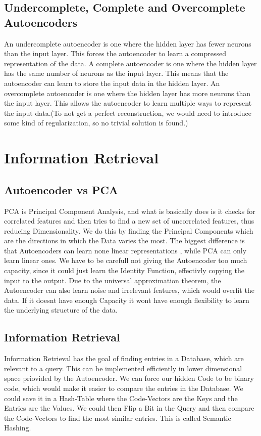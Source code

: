 \documentclass[a4paper]{article}
\begin{document}
\subsection{Undercomplete, Complete and Overcomplete Autoencoders}
An undercomplete autoencoder is one where the hidden layer has fewer neurons than the input layer. This forces the autoencoder to learn a compressed representation of the data. A complete autoencoder
is one where the hidden layer has the same number of neurons as the input layer. This means that the autoencoder can learn to store the input data in the hidden layer. An overcomplete autoencoder is one where the hidden layer has more neurons than the input layer. This allows the autoencoder to learn multiple ways to represent the input data.(To not get a perfect 
reconstruction, we would need to introduce some kind of regularization, so no trivial solution is found.)

\section{Information Retrieval}
\subsection{Autoencoder vs PCA}
PCA is Principal Component Analysis, and what is basically does is it checks for correlated features and then tries to find a new set of uncorrelated features, thus reducing Dimensionality. We do this by finding the Principal Components which are the directions in which the Data varies the most. The biggest difference is that Autoencoders can learn none linear representations
, while PCA can only learn linear ones. We have to be carefull not giving the Autoencoder too much capacity, since it could just learn the Identity Function, effectivly copying the input to the output. Due to the universal approximation theorem, the Autoencoder can also learn noise and irrelevant features, which would overfit the data. If it doesnt have enough Capacity
it wont have enough flexibility to learn the underlying structure of the data.
\subsection{Information Retrieval}
Information Retrieval has the goal of finding entries in a Database, which are relevant to a query. This can be implemented efficiently in lower dimensional space priovided by the Autoencoder. We can force our hidden Code to be binary code, which would make it easier to compare the entries in the Database. We could save it in a Hash-Table where the Code-Vectors 
are the Keys and the Entries are the Values. We could then Flip a Bit in the Query and then compare the Code-Vectors to find the most similar entries. This is called Semantic Hashing.
\end{document}
